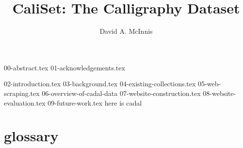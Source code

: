 \documentclass{ewuthesis}
\begin{document}
    \title{CaliSet: The Calligraphy Dataset}
    \author{David A. McInnis}    
    
    
    
    
    \frontmatter
    \maketitle          %
    \makesigpage        %
    \makelibrarystatement{}
    {00-abstract.tex}
    {01-acknowledgements.tex}
    \mainmatter
    \tableofcontents
    \listoffigures{}
    {02-introduction.tex}
    {03-background.tex}
    {04-existing-collections.tex}
    {05-web-scraping.tex}
    {06-overview-of-cadal-data}
    {07-website-construction.tex}
    {08-website-evaluation.tex}
    {09-future-work.tex}
    here is \gls{cadal}
    \chapter{glossary}

% 


% 


    \backmatter
   

    
    \makevita
    
    
\end{document}
